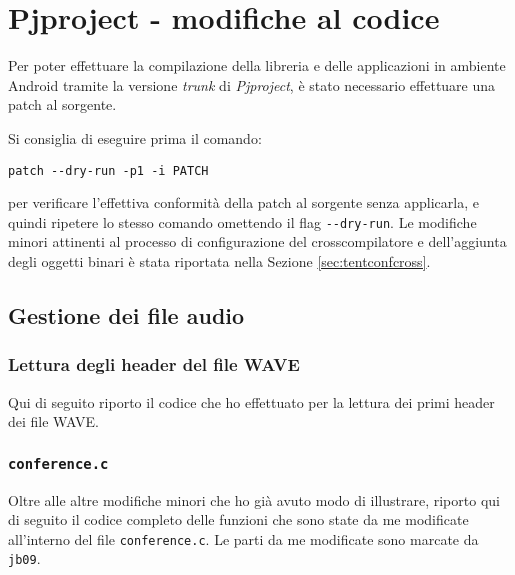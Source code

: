 \chapter{Pjproject - modifiche al codice}
\minitoc\mtcskip

Per poter effettuare la compilazione della libreria e delle applicazioni in 
ambiente Android tramite la versione \textit{trunk} di \textit{Pjproject}, è stato 
necessario effettuare una patch al sorgente.

Si consiglia di
eseguire prima il comando:
\begin{center}
\texttt{\small patch -{}-dry-run -p1 -i PATCH}
\end{center}
per verificare l'effettiva conformità della patch al sorgente senza applicarla, 
e quindi ripetere lo stesso comando omettendo il flag \texttt{\small -{}-dry-run}.
Le modifiche minori attinenti al processo di configurazione del crosscompilatore
e dell'aggiunta degli oggetti binari è stata riportata nella Sezione \vref{sec:tentconfcross}.



\section{Gestione dei file audio}
\subsection{Lettura degli header del file WAVE}\label{subsec:appreadwave}
Qui di seguito riporto il codice che ho effettuato per la lettura dei primi header
dei file WAVE.



\subsection{\texttt{\small conference.c}}\label{subsec:conferencec}
Oltre alle altre modifiche minori che ho già avuto modo di illustrare, riporto
qui di seguito il codice completo delle funzioni che sono state da me modificate
all'interno del file \texttt{\small conference.c}. Le parti da me modificate sono
marcate da \texttt{\small jb09}.


